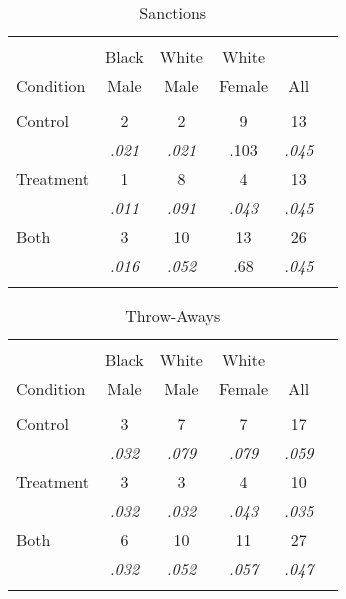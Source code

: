 \documentclass{article}\usepackage[]{graphicx}\usepackage[]{color}
\begin{document}
\begin{table}[!htbp]
\centering
\caption{Sanctions}
\begin{tabular}{lccccc} 
\\[-1.8ex]\hline 
\hline \\[-1.8ex] 
          & Black  & White  & White  &   \\
Condition & Male   &   Male &  Female & All\\
\hline \\[-1.8ex] 
Control   & 2          &     2      &         9 & 13\\
          &\textit{.021}      &    \textit{.021}  &     .103 & \textit{.045} \\
Treatment & 1          &     8      &         4 & 13\\
          &\textit{.011}      &    \textit{.091}  &    \textit{.043} & \textit{.045}  \\
Both      & 3          &    10      &        13 & 26 \\
          &\textit{.016}      &   \textit{.052}        & .68      &  \textit{.045} \\
\hline \\[-1.8ex]
\end{tabular}
\end{table}

\begin{table}[!htbp]
\centering
\caption{Throw-Aways}
\begin{tabular}{lccccc} 
\\[-1.8ex]\hline 
\hline \\[-1.8ex] 
          & Black  & White  & White  &    \\
Condition & Male   &   Male &  Female & All\\
\hline \\[-1.8ex] 
Control   & 3          &     7      &        7     &  17\\
          &\textit{.032}      &    \textit{.079}  &      \textit{.079}  & \textit{.059} \\
Treatment & 3          &     3      &        4     &  10 \\
          &\textit{.032}      &    \textit{.032}  &      \textit{.043}  &  \textit{.035} \\
Both      & 6          &    10      &        11    & 27 \\
          &\textit{.032}      &    \textit{.052}  &       \textit{.057} & \textit{.047}   \\
\hline \\[-1.8ex]
\end{tabular}
\end{table}
\end{document}
